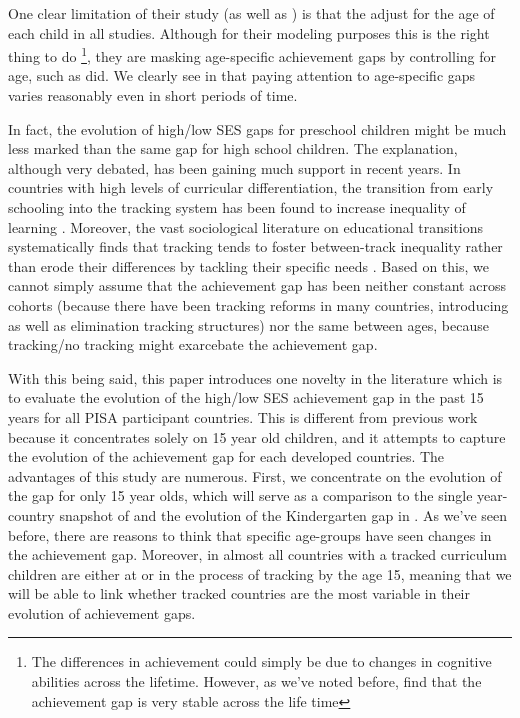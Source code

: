 \documentclass[11pt, a4paper]{article}\usepackage[]{graphicx}\usepackage[]{color}
\begin{document}
One clear limitation of their study (as well as \citet{reardon2011}) is that the adjust for the age of each child in all studies. Although for their modeling purposes this is the right thing to do \footnote{The differences in achievement could simply be due to changes in cognitive abilities across the lifetime. However, as we've noted before, \citet{bradbury2015} find that the achievement gap is very stable across the life time}, they are masking age-specific achievement gaps by controlling for age, such as \citet{reardon2011} did. We clearly see in \citet{reardon_portilla} that paying attention to age-specific gaps varies reasonably even in short periods of time.

In fact, the evolution of high/low SES gaps for preschool children might be much less marked than the same gap for high school children. The explanation, although very debated, has been gaining much support in recent years. In countries with high levels of curricular differentiation, the transition from early schooling into the tracking system has been found to increase inequality of learning \citep{hanushek_woesmann_tracking}. Moreover, the vast sociological literature on educational transitions systematically finds that tracking tends to foster between-track inequality rather than erode their differences by tackling their specific needs \citep{werfhorst_mijs}. Based on this, we cannot simply assume that the achievement gap has been neither constant across cohorts (because there have been tracking reforms in many countries, introducing as well as elimination tracking structures) nor the same between ages, because tracking/no tracking might exarcebate the achievement gap.

With this being said, this paper introduces one novelty in the literature which is to evaluate the evolution of the high/low SES achievement gap in the past 15 years for all PISA participant countries. This is different from previous work because it concentrates solely on 15 year old children, and it attempts to capture the evolution of the achievement gap for each developed countries. The advantages of this study are numerous. First, we concentrate on the evolution of the gap for only 15 year olds, which will serve as a comparison to the single year-country snapshot of \citet{anna2016} and the evolution of the Kindergarten gap in \citet{reardon_portilla}. As we've seen before, there are reasons to think that specific age-groups have seen changes in the achievement gap. Moreover, in almost all countries with a tracked curriculum children are either at or in the process of tracking by the age 15, meaning that we will be able to link whether tracked countries are the most variable in their evolution of achievement gaps.
\end{document}
